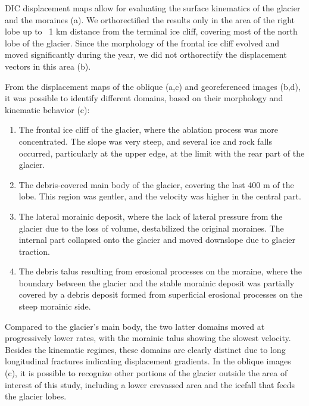 DIC displacement maps allow for evaluating the surface kinematics of the glacier and the moraines (a).
We orthorectified the results only in the area of the right lobe up to ~1 km distance from the terminal ice cliff, covering most of the north lobe of the
glacier.
Since the morphology of the frontal ice cliff evolved and moved significantly during the year, we did not orthorectify the displacement vectors in this area
(b).

From the displacement maps of the oblique (a,c) and georeferenced images (b,d), it was possible to
identify different domains, based on their morphology and kinematic behavior (c):
\begin{enumerate}
  \item The frontal ice cliff of the glacier, where the ablation process was more concentrated. The slope was very steep, and several ice and rock falls occurred, particularly at the upper edge, at the limit with the rear part of the glacier.
  \item The debris-covered main body of the glacier, covering the last 400 m of the lobe. This region was gentler, and the velocity was higher in the central part.
  \item The lateral morainic deposit, where the lack of lateral pressure from the glacier due to the loss of volume, destabilized the original moraines. The internal part collapsed onto the glacier and moved downslope due to glacier traction.
  \item The debris talus resulting from erosional processes on the moraine, where the boundary between the glacier and the stable morainic deposit was partially covered by a debris deposit formed from superficial erosional processes on the steep morainic side.
\end{enumerate}

Compared to the glacier's main body, the two latter domains moved at progressively lower rates, with the morainic talus showing the slowest velocity. 
Besides the kinematic regimes, these domains are clearly distinct due to long longitudinal fractures indicating displacement gradients. 
In the oblique images (c), it is possible to recognize other portions of the glacier outside the area of interest of this study, including a lower crevassed area and the icefall that feeds the glacier lobes.

